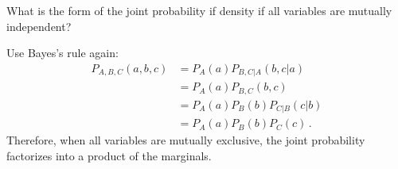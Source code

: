 

What is the form of the joint probability if density if all variables are mutually independent?


Use Bayes's rule again:
\begin{align*}
  P_{A,B,C}(a, b, c)
  &= P_A(a) P_{B,C|A}(b, c | a) \\
  &= P_A(a) P_{B,C}(b, c) \\
  &= P_A(a) P_B(b) P_{C|B}(c | b) \\
  &= P_A(a) P_B(b) P_C(c)
  \, .
\end{align*}
Therefore, when all variables are mutually exclusive, the joint probability factorizes into a product of the marginals.
